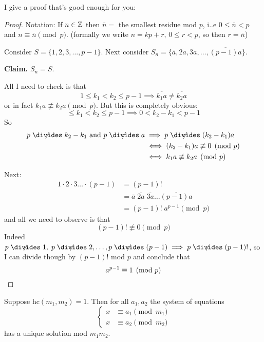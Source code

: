 \documentclass[twoside]{scrartcl}
\begin{document}
I give a proof that's good enough for you:
\begin{proof}

Notation: If $n \in\mathbb{Z}$ then $\bar{n}= $ the smallest residue mod $p$, i..e $0 \leq \bar{n} < p$ and $n \equiv \bar{n} \pmod{p}$. (formally we write $n = kp + r,\, 0 \leq r < p$, so then $r = \bar{n}$)

Consider $S = \{1,2,3,\dots,p-1\}$. Next consider $S_n = \{\bar{a},\overline{2a},\overline{3a},\dots,\overline{(p-1)a}\}$. 

\textbf{Claim.} $S_n =S$. 

All I need to check is that 
\[1 \leq k_1 < k_2 \leq p-1 \implies \overline{k_1a} \neq \overline{k_2a}\]
or in fact $k_1a \not\equiv k_2a \pmod{p}$. But this is completely obvious: 
\[ \leq k_1 < k_2 \leq p-1 \implies 0 < k_2 - k_1 < p-1\]
So \[\begin{aligned}p \centernot\divides k_2 - k_1 \text{ and }p \centernot\divides a &\implies p \centernot\divides (k_2-k_1)a\\ &\iff (k_2-k_1)a \not\equiv 0\pmod{p}\\ &\iff k_1a \not \equiv k_2 a\pmod{p}\end{aligned}\] 

Next: 
\[
\begin{aligned}
  1\cdot 2 \cdot 3 \dots \cdot (p-1) &= (p-1)!\\
  &= \overline{a}\;\overline{2a}\;\overline{3a} \dots \overline{(p-1)a}\\
  &= (p-1)!\; a^{p-1}\pmod{p}
\end{aligned}
\]
and all we need to observe is that 
\[(p-1)! \not\equiv 0 \pmod{p}\]
Indeed $p \centernot\divides 1,\; p \centernot\divides 2, \dots, p\centernot\divides (p-1) \implies p \centernot\divides (p-1)!$,  so I can divide though by $(p-1)!$ mod $p$ and conclude that 
\[a^{p-1} \equiv 1 \pmod{p}\qedhere\]
\end{proof}

\begin{theorem}
Suppose hc$(m_1,m_2) = 1$. Then for all $a_1,a_2$ the system of equations
\[\begin{cases}
x &\equiv a_1 \pmod{m_1}\\
x &\equiv a_2 \pmod{m_2}	
\end{cases}
\]
has a unique solution mod $m_1 m_2$. 
\end{theorem}
\end{document}

